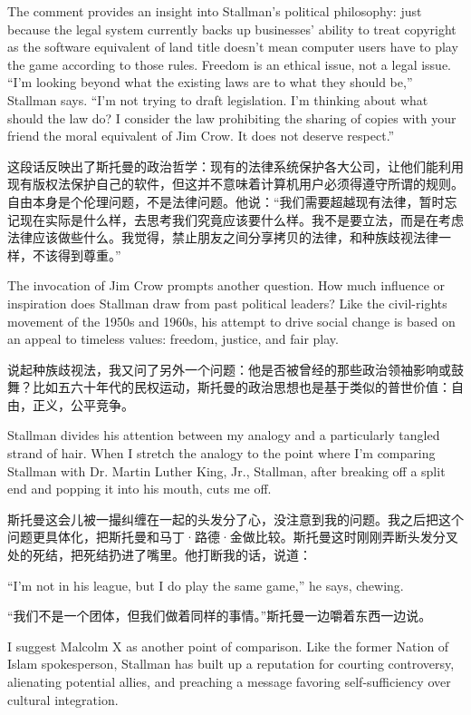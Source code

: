 \ifdefined\eng
The comment provides an insight into Stallman's political philosophy: just because the legal system currently backs up businesses' ability to treat copyright as the software equivalent of land title doesn't mean computer users have to play the game according to those rules. Freedom is an ethical issue, not a legal issue. ``I'm looking beyond what the existing laws are to what they should be,'' Stallman says. ``I'm not trying to draft legislation. I'm thinking about what should the law do? I consider the law prohibiting the sharing of copies with your friend the moral equivalent of Jim Crow. It does not deserve respect.''
\fi

\ifdefined\chs
这段话反映出了斯托曼的政治哲学：现有的法律系统保护各大公司，让他们能利用现有版权法保护自己的软件，但这并不意味着计算机用户必须得遵守所谓的规则。自由本身是个伦理问题，不是法律问题。他说：``我们需要超越现有法律，暂时忘记现在实际是什么样，去思考我们究竟应该要什么样。我不是要立法，而是在考虑法律应该做些什么。我觉得，禁止朋友之间分享拷贝的法律，和种族歧视法律一样，不该得到尊重。''
\fi

\ifdefined\eng
The invocation of Jim Crow prompts another question. How much influence or inspiration does Stallman draw from past political leaders? Like the civil-rights movement of the 1950s and 1960s, his attempt to drive social change is based on an appeal to timeless values: freedom, justice, and fair play.
\fi

\ifdefined\chs
说起种族歧视法，我又问了另外一个问题：他是否被曾经的那些政治领袖影响或鼓舞？比如五六十年代的民权运动，斯托曼的政治思想也是基于类似的普世价值：自由，正义，公平竞争。
\fi

\ifdefined\eng
Stallman divides his attention between my analogy and a particularly tangled strand of hair. When I stretch the analogy to the point where I'm comparing Stallman with Dr. Martin Luther King, Jr., Stallman, after breaking off a split end and popping it into his mouth, cuts me off.
\fi

\ifdefined\chs
斯托曼这会儿被一撮纠缠在一起的头发分了心，没注意到我的问题。我之后把这个问题更具体化，把斯托曼和马丁·路德·金做比较。斯托曼这时刚刚弄断头发分叉处的死结，把死结扔进了嘴里。他打断我的话，说道：
\fi

\ifdefined\eng
``I'm not in his league, but I do play the same game,'' he says, chewing.
\fi

\ifdefined\chs
``我们不是一个团体，但我们做着同样的事情。''斯托曼一边嚼着东西一边说。
\fi

\ifdefined\eng
I suggest Malcolm X as another point of comparison. Like the former Nation of Islam spokesperson, Stallman has built up a reputation for courting controversy, alienating potential allies, and preaching a message favoring self-sufficiency over cultural integration.
\fi


